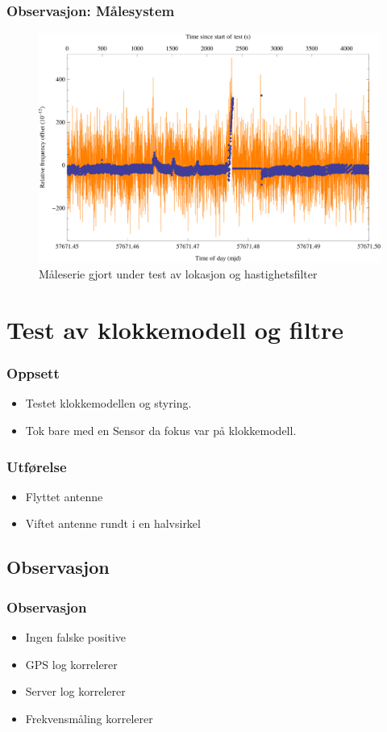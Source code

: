 \documentclass[xcolor=table]{beamer}
\begin{document}
\begin{frame}
\frametitle{Observasjon: Målesystem}
      \begin{figure}
        \includegraphics[scale=0.70]{thesis/graphics/cns91-and-csac-telemetry-frequency-1.png}
        \caption{Måleserie gjort under test av lokasjon og hastighetsfilter}
      \end{figure}
\end{frame}

\section{Test av klokkemodell og filtre}
\begin{frame}
\frametitle{Oppsett}
  \begin{itemize}
        \setlength\itemsep{2em}
    \item Testet klokkemodellen og styring.
    \item Tok bare med en Sensor da fokus var på klokkemodell.
  \end{itemize}
\end{frame}

\begin{frame}
\frametitle{Utførelse}
      \begin{itemize}
            \setlength\itemsep{2em}
        \item Flyttet antenne 
        \item Viftet antenne rundt i en halvsirkel
      \end{itemize}
\end{frame}

\begin{frame}
\subsection{Observasjon}
\frametitle{Observasjon}
      \begin{itemize}
            \setlength\itemsep{2em}
        \item Ingen falske positive
        \item GPS log korrelerer
        \item Server log korrelerer
        \item Frekvensmåling korrelerer
      \end{itemize}
\end{frame}
\end{document}
